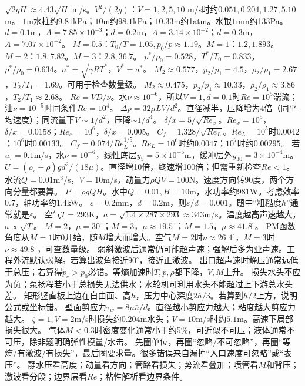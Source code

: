 $\sqrt{2gH}\approx4.43\sqrt{H}$ m/s。$V^2/(2g)$：$V=1,2,5,10$ m/s时约$0.051,0.204,1.27,5.10$m。
$1$m水柱约$9.81$kPa；$10$m约$98.1$kPa；$10.33$m约1atm。水银$1$mm约133Pa。
$d=0.1$m，$A=7.85\times10^{-3}$；$d=0.2$m，$A=3.14\times10^{-2}$；$d=0.3$m，$A=7.07\times10^{-2}$。
$M=0.5$：$T_0/T=1.05,p_0/p\approx1.19$。$M=1$：$1.2,1.893$。$M=2$：$1.8,7.82$。$M=3$：$2.8,36.7$。
$p^*/p_0=0.528$，$T^*/T_0=0.833$，$\rho^*/\rho_0=0.634$。$a^*=\sqrt{\gamma RT^*}$，$V^*=a^*$。
$M_2\approx0.577$，$p_2/p_1=4.5$，$\rho_2/\rho_1=2.67$，$T_2/T_1=1.69$。可用于检查数量级。
$M_2\approx0.475$，$p_2/p_1\approx10.33$，$\rho_2/\rho_1\approx3.86$，$T_2/T_1\approx2.68$。
$Re=VD/\nu$。水$\nu\approx10^{-6}$，所以$V=1,d=0.1$时$Re=10^5$湍流；油$\nu=10^{-5}$时同条件$Re=10^4$。
$\Delta p=32\mu LV/d^2$。直径减半，压降增为4倍（同平均速度）；同流量下$V\sim1/d^2$，压降$\sim1/d^4$。
$\delta/x=5/\sqrt{Re_x}$。$Re_x=10^5$，$\delta/x=0.0158$；$Re_x=10^6$，$\delta/x=0.005$。
$\bar C_f=1.328/\sqrt{Re_L}$。$Re_L=10^5$时$0.0042$；$10^6$时$0.00133$。
$\bar C_f=0.074/Re_L^{1/5}$。$Re_L=10^6$时约$0.0047$；$10^7$时约$0.00295$。
若$u_\tau=0.1$m/s，水$\nu=10^{-6}$，线性底层$y_5=5\times10^{-5}$m，缓冲层外$y_{30}=3\times10^{-4}$m。
$U=(\rho_s-\rho)gd^2/(18\mu)$。直径增10倍，终速增100倍；但需重新检查$Re<1$。
水流$Q=0.01$m$^3$/s，$V=10$m/s，动量力$\rho QV=100$N。速度方向转90度，两个方向分量都要算。
$P=\rho gQH$。水中$Q=0.01,H=10$m，水功率约981W。考虑效率0.7，轴功率约1.4kW。
$\varepsilon=0.2$mm，$d=0.2$m，则$\varepsilon/d=0.001$。题中“粗糙度$h$”通常就是$\varepsilon$。
空气$T=293$K，$a=\sqrt{1.4\times287\times293}\approx343$m/s。温度越高声速越大，$a\propto\sqrt T$。
$M=2$，$\mu=30^\circ$；$M=3$，$\mu\approx19.5^\circ$；$M=1.5$，$\mu\approx41.8^\circ$。
PM函数角度从$M=1$时0开始，随$M$增大而增大。空气$M=2$时$\nu\approx26.4^\circ$，$M=3$时$\nu\approx49.8^\circ$，可查数量级。
弱斜激波后通常仍可能超声速；强解后多为亚声速。工程外流默认弱解。若算出波角接近$90^\circ$，接近正激波。
出口超声速时静压通常远低于总压；若算得$p_e>p_0$必错。等熵加速时$T,p,\rho$都下降，$V,M$上升。
损失水头不应为负；泵扬程若小于总损失无法供水；水轮机可利用水头不能超过上下游总水头差。
矩形竖直板上边在自由面、高$h$，压力中心深度$2h/3$。若算到$h/2$上方，说明公式或坐标错。
壁面剪应力$\tau_w=8\mu\bar u/d$。直径越小剪应力越大；粘度越大剪应力越大。
$\zeta=1,V=2$m/s时损失约$0.204$m水头；$V=10$m/s时约$5.1$m。高速下局部损失很大。
气体$M<0.3$时密度变化通常小于约5\%，可近似不可压；液体通常不可压，除非题明确弹性模量/水击。
先圈单位，再圈“忽略/不可忽略”，再圈“等熵/有激波/有损失”，最后圈要求量。很多错误来自漏掉“入口速度可忽略”或“表压”。
静水压看高度；动量看方向；管路看损失；势流看叠加；喷管看$M$和背压；激波看分段；边界层看$Re$；粘性解析看边界条件。

